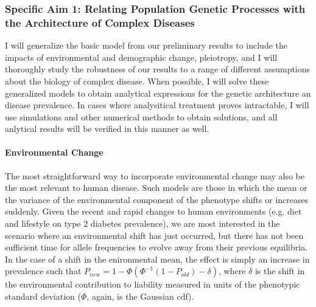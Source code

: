 \documentclass[11pt]{article}
\begin{document}
\subsubsection*{Specific Aim 1: Relating Population Genetic Processes with the Architecture of Complex Diseases}

I will generalize the basic model from our preliminary results to include the impacts of environmental and demographic change, pleiotropy, and I will thoroughly study the robustness of our results to a range of different assumptions about the biology of complex disease. When possible, I will solve these generalized models to obtain analytical expressions for the genetic architecture an disease prevalence. In cases where analysitical treatment proves intractable, I will use simulations and other numerical methods to obtain solutions, and all anlytical results will be verified in this manner as well. 


\paragraph{Environmental Change} \qquad

The most straightforward way to incorporate environmental change may also be the most relevant to human disease. Such models are those in which the mean or the variance of the environmental component of the phenotype shifts or increases suddenly. Given the recent and rapid changes to human environments (e.g. diet and lifestyle on type 2 diabetes prevalence), we are most interested in the scenario where an environmental shift has just occurred, but there has not been sufficient time for allele frequencies to evolve away from their previous equilibria. In the case of a shift in the enironmental mean, the effect is simply an increase in prevalence such that $P_{new} = 1 - \Phi\left(\Phi^{-1}\left(1-P_{old}\right)-\delta\right)$, where $\delta$ is the shift in the environmental contribution to liability measured in units of the phenotypic standard deviation ($\Phi$, again, is the Gaussian cdf).
\end{document}
